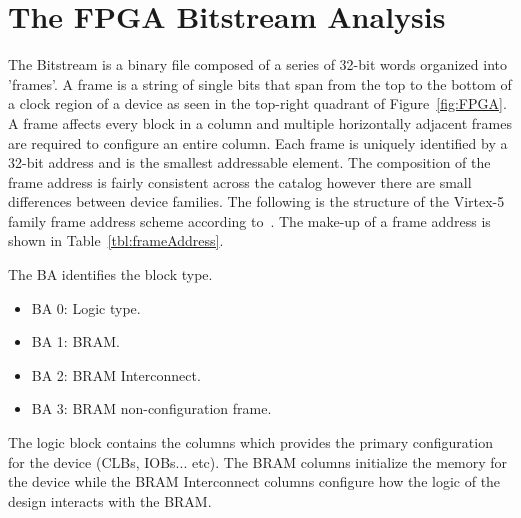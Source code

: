 \section{The \acrshort{FPGA} \gls{Bitstream} Analysis} \label{sec:fpgaBitStream}
The \Xilinx \gls{Bitstream} is a binary file composed of a series of 32-bit words organized into 'frames'.
A frame is a string of single bits that span from the top to the bottom of a clock region of a device as seen in the top-right quadrant of Figure~\ref{fig:FPGA}.
A frame affects every block in a column and multiple horizontally adjacent frames are required to configure an entire column.
Each frame is uniquely identified by a 32-bit address and is the smallest addressable element.
The composition of the frame address is fairly consistent across the \Xilinx catalog however there are small differences between device families.
The following is the structure of the Virtex-5 family frame address scheme according to~\cite{virtex5ConfigGuide}.
The make-up of a frame address is shown in Table~\ref{tbl:frameAddress}.
\begin{table}[h]
	\centering
	\caption{Frame Address}
	\label{tbl:frameAddress}
\end{table}

The \acrfull{BA} identifies the block type.
\begin{itemize}
	\item BA 0: Logic type.
	\item BA 1: \acrfull{BRAM}.
	\item BA 2: \acrshort{BRAM} Interconnect.
	\item BA 3: \acrshort{BRAM} non-configuration frame.
\end{itemize}
The logic block contains the columns which provides the primary configuration for the device (\acrshort{CLBs}, \acrshort{IOBs}... etc).
The \acrshort{BRAM} columns initialize the memory for the device while the \acrshort{BRAM} Interconnect columns configure how the logic of the design interacts with the \acrshort{BRAM}.


